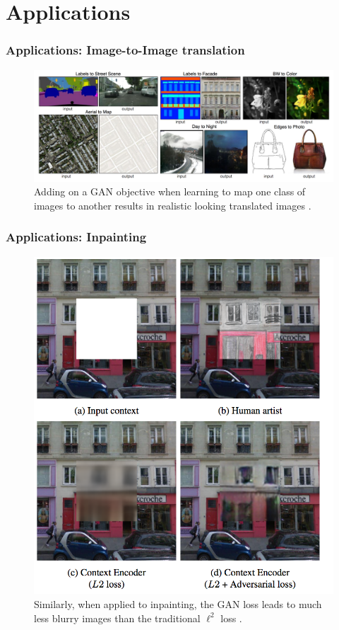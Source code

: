 \documentclass[10pt,mathserif]{beamer}
\begin{document}
\section{Applications}
\label{sec:applications}

\begin{frame}
  \frametitle{Applications: Image-to-Image translation}
\begin{figure}[ht]
  \centering
  \includegraphics[width=0.9\paperwidth]{figure/image_to_image}
  \caption{Adding on a GAN objective when learning to map one class of images to
    another results in realistic looking translated
    images \citep{isola2017image}. \label{fig:image_to_image} }
\end{figure}
\end{frame}

\begin{frame}
  \frametitle{Applications: Inpainting}
\begin{figure}[ht]
  \centering
  \includegraphics[width=0.45\paperwidth]{figure/inpainting}
  \caption{Similarly, when applied to inpainting, the GAN loss leads to much
    less blurry images than the traditional $\ell^{2}$
    loss \citep{pathak2016context}. \label{fig:inpainting} }
\end{figure}
\end{frame}
\end{document}
